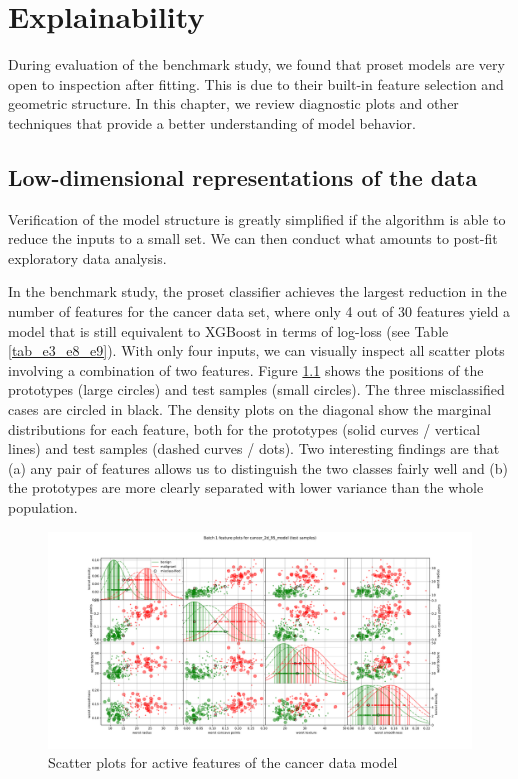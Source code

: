 \chapter{Explainability}
\label{ch_explainability}
%
During evaluation of the benchmark study, we found that proset models are very open to inspection after fitting.
This is due to their built-in feature selection and geometric structure.
In this chapter, we review diagnostic plots and other techniques that provide a better understanding of model behavior.
%
\section{Low-dimensional representations of the data}
\label{sec_low_dimensional}
%
Verification of the model structure is greatly simplified if the algorithm is able to reduce the inputs to a small set.
We can then conduct what amounts to post-fit exploratory data analysis.\par
%
In the benchmark study, the proset classifier achieves the largest reduction in the number of features for the cancer data set, where only 4 out of 30 features yield a model that is still equivalent to XGBoost in terms of log-loss (see Table \ref{tab_e3_e8_e9}).
With only four inputs, we can visually inspect all scatter plots involving a combination of two features.
Figure \ref{fig_scatter_plots_cancer} shows the positions of the prototypes (large circles) and test samples (small circles).
The three misclassified cases are circled in black.
The density plots on the diagonal show the marginal distributions for each feature, both for the prototypes (solid curves / vertical lines) and test samples (dashed curves / dots).
Two interesting findings are that (a) any pair of features allows us to distinguish the two classes fairly well and (b) the prototypes are more clearly separated with lower variance than the whole population.\par
%
\begin{figure}
\caption{Scatter plots for active features of the cancer data model}
\label{fig_scatter_plots_cancer}
%
\begin{center}
\includegraphics[width=0.95\textheight, angle=90]{figures/cancer_scatter_plot_testing_data.pdf}
\end{center}
\end{figure}
